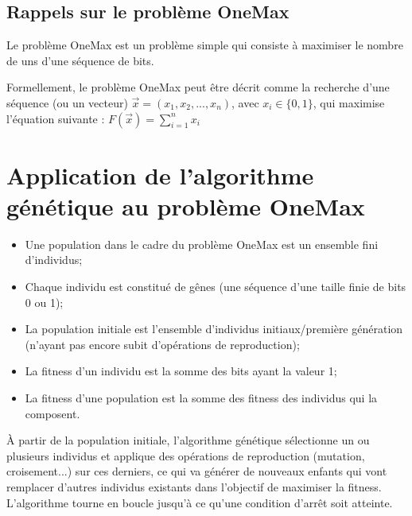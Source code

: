 \documentclass[12pt]{article}
\begin{document}
\subsection{Rappels sur le problème OneMax}
\par Le problème OneMax est un problème simple qui consiste à maximiser le nombre de uns d'une séquence de bits.
\par Formellement, le problème OneMax peut être décrit comme la recherche d'une séquence (ou un vecteur) $ \vec{x} = (x_1, x_2, ... , x_n) $, avec $ x_i \in \{0,1\} $, qui maximise l'équation suivante : $ F(\vec{x}) = \sum_{i=1}^{n} x_i $

\section{Application de l'algorithme génétique au problème OneMax}
\begin{itemize}[label=-]
\item Une population dans le cadre du problème OneMax est un ensemble fini d'individus;
\item Chaque individu est constitué de gênes (une séquence d'une taille finie de bits 0 ou 1);
\item La population initiale est l'ensemble d'individus initiaux/première génération (n'ayant pas encore subit d'opérations de reproduction);
\item La fitness d'un individu est la somme des bits ayant la valeur 1;
\item La fitness d'une population est la somme des fitness des individus qui la composent.
\end{itemize}

\par À partir de la population initiale, l'algorithme génétique sélectionne un ou plusieurs individus et applique des opérations de reproduction (mutation, croisement...) sur ces derniers, ce qui va générer de nouveaux enfants qui vont remplacer d'autres individus existants dans l'objectif de maximiser la fitness. L'algorithme tourne en boucle jusqu'à ce qu'une condition d'arrêt soit atteinte. 
\end{document}
